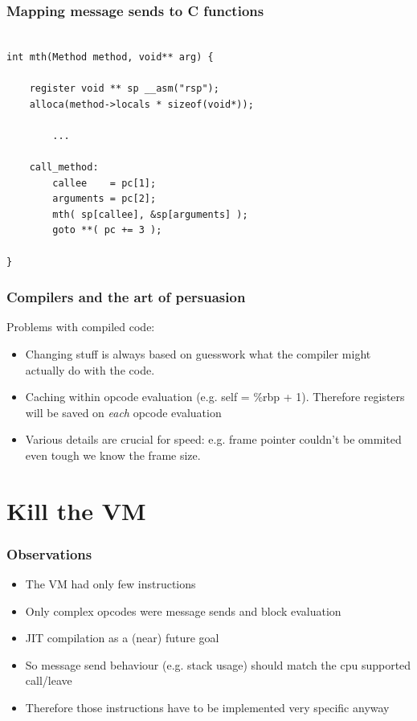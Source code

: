 \documentclass{beamer}
\begin{document}
\begin{frame}[fragile]
    \frametitle{Mapping message sends to C functions}
    \begin{lstlisting}

int mth(Method method, void** arg) {

    register void ** sp __asm("rsp");
    alloca(method->locals * sizeof(void*));

        ...

    call_method:
        callee    = pc[1];
        arguments = pc[2]; 
        mth( sp[callee], &sp[arguments] );
        goto **( pc += 3 );

}
    \end{lstlisting}
\end{frame}

\begin{frame}[fragile]
    \frametitle{Compilers and the art of persuasion}
    Problems with compiled code:
    \begin{itemize}
        \item Changing stuff is always based on guesswork what the compiler might 
                actually do with the code.
        \item Caching within opcode evaluation (e.g. self = \%rbp + 1). Therefore registers
              will be saved on {\em each} opcode evaluation
        \item Various details are crucial for speed: 
                e.g. frame pointer couldn't be ommited even tough we know the frame size.
    \end{itemize}
\end{frame}

\section{Kill the VM}

\begin{frame}[fragile]
    \frametitle{Observations}
    \begin{itemize}
        \item The VM had only few instructions
        \item Only complex opcodes were message sends and block evaluation
        \item JIT compilation as a (near) future goal
        \item So message send behaviour (e.g. stack usage) should match the cpu supported call/leave
        \item Therefore those instructions have to be implemented very specific anyway
    \end{itemize}
\end{frame}
\end{document}
